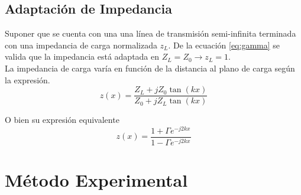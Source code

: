 \documentclass[11pt,a4paper]{article}
\begin{document}
\begin{multicols}{2}
\subsection{Adaptación de Impedancia}

Suponer que se cuenta con una una línea de transmisión semi-infinita terminada con una impedancia de carga normalizada $z_L$.
De la ecuación \ref{eq:gamma} se valida que la impedancia está adaptada en $Z_L = Z_0 \longrightarrow z_L = 1$.\\

La impedancia de carga varía en función de la distancia al plano de carga según la expresión.\\

\begin{equation*}
    z(x) = \frac{Z_L + j Z_0\tan(kx)}{Z_0 + j Z_L\tan(kx)}
\end{equation*}

O bien su expresión equivalente
\begin{equation*}
    z(x) = \frac{1 + \Gamma e^{-j2kx}}{1 - \Gamma e^{-j2kx}}
\end{equation*}


\section{Método Experimental}


\end{multicols}
\end{document}
